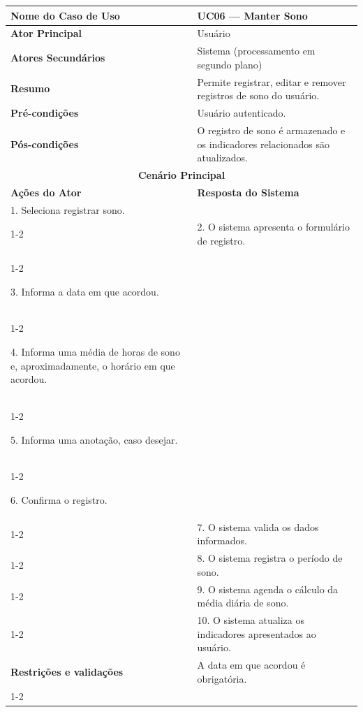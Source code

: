 
\begin{longtable}{| p{} | p{} |}
\hline

\textbf{Nome do Caso de Uso} &
UC06 --- Manter Sono \\
\hline

\textbf{Ator Principal} &
Usuário \\
\hline

\textbf{Atores Secundários} &
Sistema (processamento em segundo plano) \\
\hline

\textbf{Resumo} &
Permite registrar, editar e remover registros de sono do usuário. \\
\hline

\textbf{Pré-condições} &
Usuário autenticado. \\
\hline

\textbf{Pós-condições} &
O registro de sono é armazenado e os indicadores relacionados são atualizados. \\
\hline

\multicolumn{2}{|c|}{\textbf{Cenário Principal}}\\
\hline

\textbf{Ações do Ator} &
\textbf{Resposta do Sistema} \\
\hline

1. Seleciona registrar sono. & \\
\cline{1-2}

&
2. O sistema apresenta o formulário de registro. \\
\cline{1-2}

3. Informa a data em que acordou. &
\\
\cline{1-2}

4. Informa uma média de horas de sono e, aproximadamente, o horário em que
acordou. &
\\
\cline{1-2}

5. Informa uma anotação, caso desejar. &
\\
\cline{1-2}

6. Confirma o registro. & \\
\cline{1-2}

& 7. O sistema valida os dados informados. \\
\cline{1-2}

& 8. O sistema registra o período de sono. \\
\cline{1-2}

& 9. O sistema agenda o cálculo da média diária de sono. \\
\cline{1-2}

& 10. O sistema atualiza os indicadores apresentados ao usuário. \\
\hline

\multirow{1}{.40\textwidth}{\textbf{Restrições e validações}}
&
A data em que acordou é obrigatória. \\
\cline{1-2}
\hline

\end{longtable}
